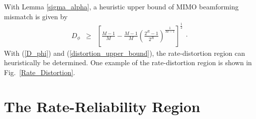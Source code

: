 \documentclass[10pt,fleqn, twocolumn]{IEEEtran}
\begin{document}
With Lemma \ref{sigma_alpha}, a heuristic upper bound of MIMO
beamforming mismatch is given by
\begin{equation}
\begin{array}{rcl}
D_{\phi}&\geq&\left[\frac{M-1}{M}-\frac{M-1}{M}\left(\frac{2^{R}-1}{2^R}\right)^{\frac{1}{M-1}}\right]^{\frac{1}{2}}
\end{array}.\label{distortion_upper_bound}
\end{equation}
\noindent With (\ref{D_phi}) and (\ref{distortion_upper_bound}),
the rate-distortion region can heuristically be determined. One
example of the rate-distortion region is shown in
Fig.~\ref{Rate_Distortion}.
\begin{figure}
\end{figure}

\section{The Rate-Reliability Region}
\end{document}
